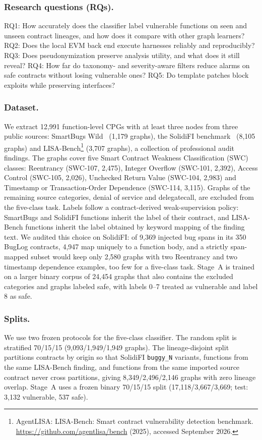\documentclass[runningheads]{llncs}
\begin{document}
\subsubsection{Research questions (RQs).}
RQ1: How accurately does the classifier label vulnerable functions on seen and unseen contract lineages, and how does it compare with other graph learners?
RQ2: Does the local EVM back end execute harnesses reliably and reproducibly?
RQ3: Does pseudonymization preserve analysis utility, and what does it still reveal?
RQ4: How far do taxonomy- and severity-aware filters reduce alarms on safe contracts without losing vulnerable ones?
RQ5: Do template patches block exploits while preserving interfaces?

\subsubsection{Dataset.}
We extract 12,991 function-level CPGs with at least three nodes from three public sources: SmartBugs Wild~\cite{durieux2020empirical} (1,179 graphs), the SolidiFI benchmark~\cite{ghaleb2020effective} (8,105 graphs) and LISA-Bench\footnote{AgentLISA: LISA-Bench: Smart contract vulnerability detection benchmark. \url{https://github.com/agentlisa/bench} (2025), accessed September 2026.} (3,707 graphs), a collection of professional audit findings. The graphs cover five Smart Contract Weakness Classification (SWC) classes: Reentrancy (SWC-107, 2,475), Integer Overflow (SWC-101, 2,392), Access Control (SWC-105, 2,026), Unchecked Return Value (SWC-104, 2,983) and Timestamp or Transaction-Order Dependence (SWC-114, 3,115). Graphs of the remaining source categories, denial of service and delegatecall, are excluded from the five-class task.
Labels follow a contract-derived weak-supervision policy: SmartBugs and SolidiFI functions inherit the label of their contract, and LISA-Bench functions inherit the label obtained by keyword mapping of the finding text. We audited this choice on SolidiFI: of 9,369 injected bug spans in its 350 BugLog contracts, 4,947 map uniquely to a function body, and a strictly span-mapped subset would keep only 2,580 graphs with two Reentrancy and two timestamp dependence examples, too few for a five-class task. Stage~A is trained on a larger binary corpus of 24,454 graphs that also contains the excluded categories and graphs labeled safe, with labels 0--7 treated as vulnerable and label 8 as safe.

\subsubsection{Splits.}
We use two frozen protocols for the five-class classifier. The random split is stratified 70/15/15 (9,093/1,949/1,949 graphs). The lineage-disjoint split partitions contracts by origin so that SolidiFI \texttt{buggy\_N} variants, functions from the same LISA-Bench finding, and functions from the same imported source contract never cross partitions, giving 8,349/2,496/2,146 graphs with zero lineage overlap. Stage~A uses a frozen binary 70/15/15 split (17,118/3,667/3,669; test: 3,132 vulnerable, 537 safe).
\end{document}
